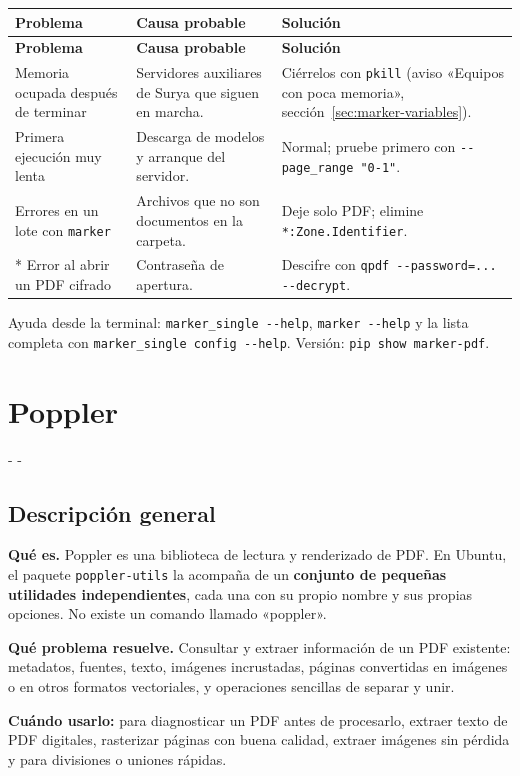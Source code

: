 \documentclass[11pt,a4paper]{article}
\makeatletter
\newcommand{\necesitaespacio}[1]{\par\penalty-100\begingroup
	\setlength{\dimen@}{#1}\dimen@ii\pagegoal\advance\dimen@ii-\pagetotal
	\ifdim\dimen@>\dimen@ii\ifdim\dimen@ii>\z@\vfil\fi\penalty-\@M\fi\endgroup}
\newenvironment{errores}{%
	\par\begingroup\small
	\begin{longtable}{L{4.1cm}L{4.9cm}L{6.0cm}}
		\toprule\rowcolor{tablacab}\cab{Problema} & \cab{Causa probable} & \cab{Solución} \\ \midrule
		\endfirsthead
		\toprule\rowcolor{tablacab}\cab{Problema} & \cab{Causa probable} & \cab{Solución} \\ \midrule
		\endhead
		\bottomrule
		\endfoot}
	{\end{longtable}\endgroup}
\newcommand{\cmd}[1]{\texttt{\textcolor{colcmd}{#1}}}      %
\newcommand{\opt}[1]{\texttt{\textcolor{colopt}{#1}}}      %
\newcommand{\arch}[1]{\texttt{\textcolor{colarch}{#1}}}    %
\newcommand{\cab}[1]{\textbf{#1}}
\makeatother
\begin{document}
\begin{errores}
		Memoria ocupada después de terminar & Servidores auxiliares de Surya que siguen en marcha. & Ciérrelos con \cmd{pkill} (aviso «Equipos con poca memoria», sección~\ref{sec:marker-variables}).\\
		Primera ejecución muy lenta & Descarga de modelos y arranque del servidor. & Normal; pruebe primero con \opt{-{}-page\_\allowbreak{}range "0-\allowbreak{}1"}.\\
		Errores en un lote con \cmd{marker} & Archivos que no son documentos en la carpeta. & Deje solo PDF; elimine \arch{*:Zone.Identifier}.\\*
		Error al abrir un PDF cifrado & Contraseña de apertura. & Descifre con \cmd{qpdf -{}-password=\allowbreak{}... -{}-decrypt}.\\
	\end{errores}
	
	Ayuda desde la terminal: \cmd{marker\_\allowbreak{}single -{}-help}, \cmd{marker -{}-help} y la lista completa con \cmd{marker\_\allowbreak{}single config -{}-help}. Versión: \cmd{pip show marker-\allowbreak{}pdf}.
	\clearpage
	\section{Poppler}\label{sec:poppler}
	
	\necesitaespacio{8\baselineskip}
	\subsection{Descripción general}
	
	\textbf{Qué es.} Poppler es una biblioteca de lectura y renderizado de PDF. En Ubuntu, el paquete \texttt{poppler-utils} la acompaña de un \textbf{conjunto de pequeñas utilidades independientes}, cada una con su propio nombre y sus propias opciones. No existe un comando llamado «poppler».
	
	\textbf{Qué problema resuelve.} Consultar y extraer información de un PDF existente: metadatos, fuentes, texto, imágenes incrustadas, páginas convertidas en imágenes o en otros formatos vectoriales, y operaciones sencillas de separar y unir.
	
	\textbf{Cuándo usarlo:} para diagnosticar un PDF antes de procesarlo, extraer texto de PDF digitales, rasterizar páginas con buena calidad, extraer imágenes sin pérdida y para divisiones o uniones rápidas.
	
\end{document}
